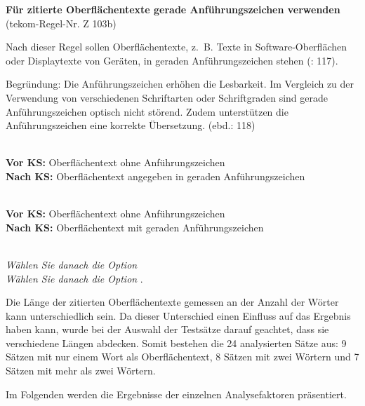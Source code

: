 \begin{description}[font=\normalfont\bfseries]
\item [Beschreibung der KS-Regel:] \textbf{Für zitierte Oberflächentexte gerade Anführungszeichen verwenden} (tekom-Regel-Nr. Z 103b)

Nach dieser Regel sollen Oberflächentexte, z.~B. Texte in Software-Oberflä\-chen oder Displaytexte von Geräten, in geraden Anführungszeichen stehen (\citealt{tekom2013}: 117).

Begründung: Die Anführungszeichen erhöhen die Lesbarkeit. Im Vergleich zu der Verwendung von verschiedenen Schriftarten oder Schriftgraden sind gerade Anführungszeichen optisch nicht störend. Zudem unterstützen die Anführungszeichen eine korrekte Übersetzung. (ebd.: 118)

\item[Umsetzungsmuster:]
~\\
\textbf{Vor KS:} Oberflächentext ohne Anführungszeichen\\
\textbf{Nach KS:} Oberflächentext angegeben in geraden Anführungszeichen

\item[KS-Stelle]
~\\
\textbf{Vor KS:} Oberflächentext ohne Anführungszeichen\\
\textbf{Nach KS:} Oberflächentext mit geraden Anführungszeichen

\item[Beispiele]
~\\
\textit{Wählen Sie danach die Option }\\
\textit{Wählen Sie danach die Option }.

\item[Aufteilung der Testsätze:]
Die Länge der zitierten Oberflächentexte gemessen an der Anzahl der Wörter kann unterschiedlich sein. Da dieser Unterschied einen Einfluss auf das Ergebnis haben kann, wurde bei der Auswahl der Testsätze darauf geachtet, dass sie verschiedene Längen abdecken. Somit bestehen die 24 analysierten Sätze aus: 9 Sätzen mit nur einem Wort als Oberflächentext, 8 Sätzen mit zwei Wörtern und 7 Sätzen mit mehr als zwei Wörtern.

\end{description}


Im Folgenden werden die Ergebnisse der einzelnen Analysefaktoren präsentiert.

